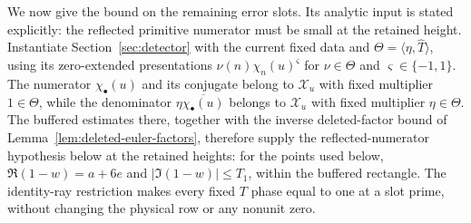 \documentclass[12pt]{article}
\begin{document}
We now give the bound on the remaining error slots.  Its analytic
input is stated explicitly: the reflected primitive numerator must
be small at the retained height.  Instantiate Section~\ref{sec:detector}
with the current fixed data and $\Theta=\langle\eta,\widehat T\rangle$,
using its zero-extended presentations $\nu(n)\chi_n(u)^\varsigma$ for
$\nu\in\Theta$ and $\varsigma\in\{-1,1\}$.  The
numerator $\chi_\bullet(u)$ and its conjugate belong to $\mathcal X_u$
with fixed multiplier $1\in\Theta$, while the denominator
$\eta\overline{\chi_\bullet(u)}$ belongs to $\mathcal X_u$ with fixed
multiplier $\eta\in\Theta$.  The buffered estimates there, together with
the inverse deleted-factor bound of Lemma~\ref{lem:deleted-euler-factors},
therefore supply the reflected-numerator hypothesis below at the retained
heights: for the points used below, $\Re(1-w)=a+6e$ and
$|\Im(1-w)|\le T_1$, within the buffered rectangle.  The identity-ray
restriction makes every fixed $T$ phase equal to one at a
slot prime, without changing the physical row or any nonunit zero.
\end{document}
